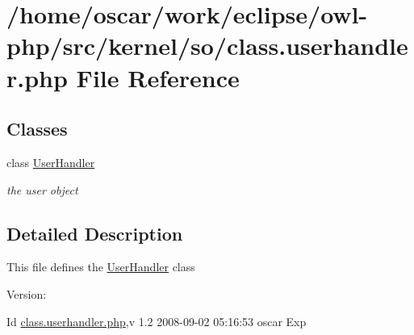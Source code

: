 \hypertarget{class_8userhandler_8php}{
\section{/home/oscar/work/eclipse/owl-php/src/kernel/so/class.userhandler.php File Reference}
\label{class_8userhandler_8php}
}
\subsection*{Classes}
\begin{CompactItemize}
\item 
class \hyperlink{classUserHandler}{UserHandler}
\begin{CompactList}\small\item\em the user object \item\end{CompactList}\end{CompactItemize}


\subsection{Detailed Description}
This file defines the \hyperlink{classUserHandler}{UserHandler} class \begin{Desc}
\item[Version:]\end{Desc}
\begin{Desc}
\item[Id]\hyperlink{class_8userhandler_8php}{class.userhandler.php},v 1.2 2008-09-02 05:16:53 oscar Exp \end{Desc}
